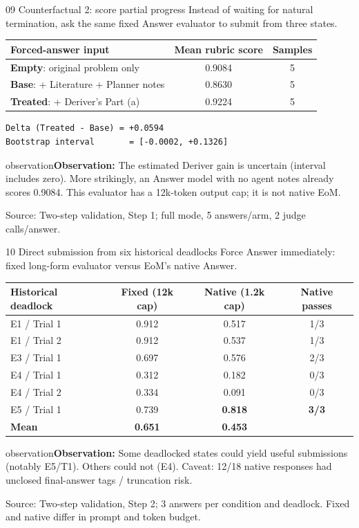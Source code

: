 \documentclass[aspectratio=169,10pt]{beamer}
\newcommand{\observation}[1]{\vspace{2mm}\begin{beamercolorbox}[rounded=true,sep=1ex,wd=\textwidth]{observation}\small\textbf{Observation:} #1\end{beamercolorbox}}
\newcommand{\source}[1]{\vfill{\tiny\textcolor{muted}{Source: #1}}}
\begin{document}
\begin{frame}[fragile]{09 \quad Counterfactual 2: score partial progress}
\small\textcolor{muted}{Instead of waiting for natural termination, ask the same fixed Answer evaluator to submit from three states.}
\vspace{3mm}
\centering
\begin{tabular}{lcc}
\toprule
Forced-answer input & Mean rubric score & Samples\\
\midrule
\textbf{Empty}: original problem only & 0.9084 & 5\\
\textbf{Base}: + Literature + Planner notes & 0.8630 & 5\\
\textbf{Treated}: + Deriver's Part (a) & 0.9224 & 5\\
\bottomrule
\end{tabular}
\par\vspace{5mm}
\begin{lstlisting}
Delta (Treated - Base) = +0.0594
Bootstrap interval       = [-0.0002, +0.1326]
\end{lstlisting}
\observation{The estimated Deriver gain is uncertain (interval includes zero). More strikingly, an Answer model with no agent notes already scores 0.9084. This evaluator has a 12k-token output cap; it is not native EoM.}
\source{Two-step validation, Step 1; full mode, 5 answers/arm, 2 judge calls/answer.}
\end{frame}

\begin{frame}[fragile]{10 \quad Direct submission from six historical deadlocks}
\small\textcolor{muted}{Force Answer immediately: fixed long-form evaluator versus EoM's native Answer.}
\vspace{2mm}
\centering
\begin{tabular}{lccc}
\toprule
Historical deadlock & Fixed (12k cap) & Native (1.2k cap) & Native passes\\
\midrule
E1 / Trial 1 & 0.912 & 0.517 & 1/3\\
E1 / Trial 2 & 0.912 & 0.537 & 1/3\\
E3 / Trial 1 & 0.697 & 0.576 & 2/3\\
E4 / Trial 1 & 0.312 & 0.182 & 0/3\\
E4 / Trial 2 & 0.334 & 0.091 & 0/3\\
E5 / Trial 1 & 0.739 & \textbf{0.818} & \textbf{3/3}\\
\midrule
\textbf{Mean} & \textbf{0.651} & \textbf{0.453} & \\[-1ex]
\bottomrule
\end{tabular}
\observation{Some deadlocked states could yield useful submissions (notably E5/T1). Others could not (E4). Caveat: 12/18 native responses had unclosed final-answer tags / truncation risk.}
\source{Two-step validation, Step 2; 3 answers per condition and deadlock. Fixed and native differ in prompt and token budget.}
\end{frame}
\end{document}
